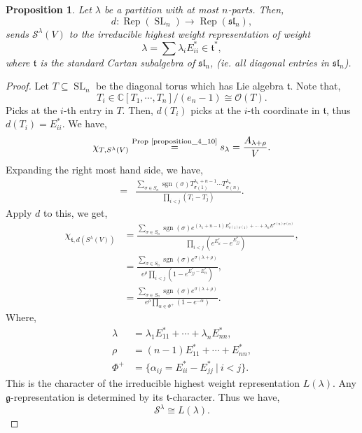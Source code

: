 \documentclass[10pt]{article}
\newtheorem{proposition}{Proposition}[section]
\numberwithin{equation}{theorem}
\DeclareMathOperator{\SL}{SL}
\DeclareMathOperator{\Rep}{Rep}
\DeclareMathOperator{\sgn}{sgn}
\newcommand{\Ouv}[0]{\mathcal{O}}
\newcommand{\C}[0]{\mathbb{C}}
\newcommand{\g}[0]{\mathfrak{g}}
\newcommand{\tl}[0]{\mathfrak{t}}
\newcommand{\spl}[0]{\mathfrak{sl}}
\newcommand{\sep}[0]{\:|\:}
\begin{document}
  \begin{proposition}
    \label{proposition_5_32}
    Let $\lambda$ be a partition with at most $n$-parts. Then,
    \begin{equation*}
      d:\Rep(\SL_n)\to\Rep(\spl_n),
    \end{equation*}
    sends $\mathcal{S}^\lambda(V)$ to the irreducible highest weight representation of weight 
    \begin{equation*}
      \lambda = \sum\lambda_iE_{ii}^*\in\tl^*,
    \end{equation*}
    where $\tl$ is the standard Cartan subalgebra of $\spl_n$, (ie. all diagonal entries in $\spl_n$).
  \end{proposition}
  \begin{proof}
    Let $T\subseteq\SL_n$ be the diagonal torus which has Lie algebra $\tl$. Note that,
    \begin{equation*}
      T_i\in\C[T_1,\cdots,T_n]/(e_n-1)\cong\Ouv(T).
    \end{equation*}
    Picks at the $i$-th entry in $T$. Then, $d(T_i)$ picks at the $i$-th coordinate in $\tl$, thus $d(T_i) = E_{ii}^*$.
    We have,
    \begin{equation*}
      \chi_{T,S^\lambda(V)}\stackrel{\text{Prop \text{\ref{proposition_4_10}}}}{=} s_\lambda = {\frac {A_{\lambda+\rho}} {V}}.
    \end{equation*}
    Expanding the right most hand side, we have,
    \begin{align*}
      = & {\frac {\sum_{\sigma\in S_n}\sgn(\sigma)T_{\sigma(1)}^{\lambda_1+n-1}\cdots T_{\sigma(n)}^{\lambda_n}} {\prod_{i<j}(T_i-T_j)}}.
    \end{align*}
    Apply $d$ to this, we get,
    \begin{align*}
      \chi_{\tl,d(S^\lambda(V))} &= {\frac {\sum_{\sigma\in S_n}\sgn(\sigma)e^{(\lambda_1+n-1)E_{\sigma(1)\sigma(1)}^*+\cdots+\lambda_nE^{\sigma(n)\sigma(n)}}} {\prod_{i<j}(e^{E^*_{ii}}-e^{E^*_{jj}})}},\\
      & = {\frac {\sum_{\sigma\in S_n}\sgn(\sigma)e^{\sigma(\lambda+\rho)}} {e^\rho\prod_{i<j}(1-e^{E^*_{jj}-E^*_{ii}})}},\\
      & = {\frac {\sum_{\sigma\in S_n}\sgn(\sigma)e^{\sigma(\lambda+\rho)}} {e^\rho\prod_{\alpha\in\Phi^+}(1-e^{-\alpha})}}.
    \end{align*}
    Where,
    \begin{align*}
      \lambda & = \lambda_1E_{11}^*+\cdots+\lambda_nE_{nn}^*,\\
      \rho & = (n-1)E_{11}^*+\cdots+E_{nn}^*,\\
      \Phi^+ &= \{\alpha_{ij}=E_{ii}^*-E_{jj}^*\sep i<j\}.
    \end{align*}
    This is the character of the irreducible highest weight representation $L(\lambda)$. Any $\g$-representation is determined by its $\tl$-character. Thus we have,
    \begin{equation*}
      \mathcal{S}^\lambda \cong L(\lambda).
    \end{equation*}
  \end{proof}
\end{document}

